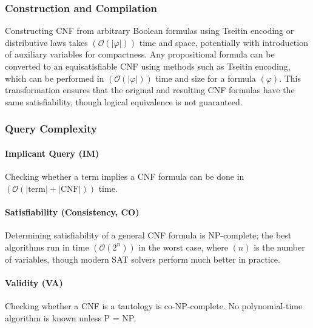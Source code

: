 \subsubsection{Construction and Compilation}
Constructing CNF from arbitrary Boolean formulas using Tseitin encoding or distributive laws takes $(\mathcal{O}(|\varphi|))$ time and space, potentially with introduction of auxiliary variables for compactness. Any propositional formula can be converted to an equisatisfiable CNF using methods such as Tseitin encoding, which can be performed in $(\mathcal{O}(|\varphi|))$ time and size for a formula $(\varphi)$. This transformation ensures that the original and resulting CNF formulas have the same satisfiability, though logical equivalence is not guaranteed.

\subsubsection{Query Complexity}

\paragraph{Implicant Query (IM)}
Checking whether a term implies a CNF formula can be done in $(\mathcal{O}(|\text{term}| + |\text{CNF}|))$ time.

\paragraph{Satisfiability (Consistency, CO)}
Determining satisfiability of a general CNF formula is NP-complete; the best algorithms run in time $(\mathcal{O}(2^n))$ in the worst case, where $(n)$ is the number of variables, though modern SAT solvers perform much better in practice.

\paragraph{Validity (VA)}
Checking whether a CNF is a tautology is co-NP-complete. No polynomial-time algorithm is known unless P = NP.

